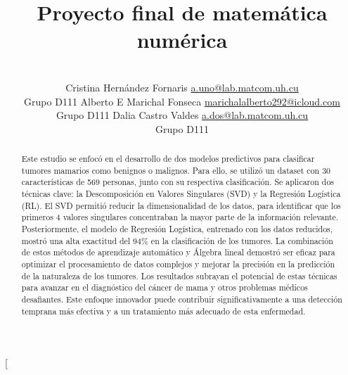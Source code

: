 \documentclass[a4paper,10pt,twocolumn]{article}
\title{Proyecto final de matemática numérica}
\author{\\
\name Cristina Hernández Fornaris \email \href{mailto:a.uno@lab.matcom.uh.cu}{a.uno@lab.matcom.uh.cu}
	\\ \addr Grupo D111 \AND
\name Alberto E Marichal Fonseca \email \href{mailto:a.dos@lab.matcom.uh.cu}{marichalalberto292@icloud.com}
  \\ \addr Grupo D111\AND
\name Dalia Castro Valdes \email \href{mailto:a.dos@lab.matcom.uh.cu}{a.dos@lab.matcom.uh.cu}
  \\ \addr Grupo D111}
\begin{document}
\twocolumn[

\maketitle


\begin{abstract}

	Este estudio se enfocó en el desarrollo de dos modelos predictivos para clasificar tumores mamarios como benignos o malignos. Para ello, se utilizó un dataset con 30 características de 569 personas, junto con su respectiva clasificación. Se aplicaron dos técnicas clave: la Descomposición en Valores Singulares (SVD) y la Regresión Logística (RL). El SVD permitió reducir la dimensionalidad de los datos, para identificar que los primeros 4 valores singulares concentraban la mayor parte de la información relevante. Posteriormente, el modelo de Regresión Logística, entrenado con los datos reducidos, mostró una alta exactitud del 94\% en la clasificación de los tumores. La combinación de estos métodos de aprendizaje automático y Álgebra lineal demostró ser eficaz para optimizar el procesamiento de datos complejos y mejorar la precisión en la predicción de la naturaleza de los tumores. Los resultados subrayan el potencial de estas técnicas para avanzar en el diagnóstico del cáncer de mama y otros problemas médicos desafiantes. Este enfoque innovador puede contribuir significativamente a una detección temprana más efectiva y a un tratamiento más adecuado de esta enfermedad.

\end{abstract}

\vspace{0.5cm}
\end{document}
